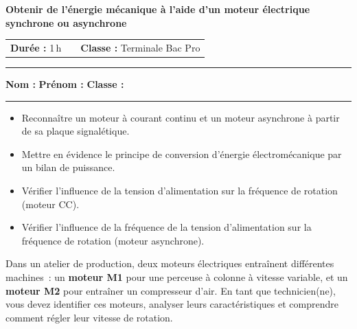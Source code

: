 \documentclass[12pt,a4paper]{article}
\begin{document}



\begin{center}
  {\Large\bfseries\color{mainblue}
    {Obtenir de l'\'{e}nergie m\'{e}canique \`{a} l'aide d'un moteur \'{e}lectrique} synchrone ou asynchrone}\\[0.4cm]
  \begin{tabular}{@{}lcr@{}}
    \textbf{Dur\'{e}e :} 1\,h
    & \hspace{4cm}
    & \textbf{Classe :} Terminale Bac Pro
  \end{tabular}
\end{center}

{\color{mainblue}\rule{\linewidth}{1pt}}

\vspace{0.3cm}
\textbf{Nom :} \dotfill \hspace{2cm} \textbf{Pr\'{e}nom :} \dotfill \hspace{2cm} \textbf{Classe :} \dotfill

\vspace{0.3cm}
{\color{mainblue}\rule{\linewidth}{1pt}}
\vspace{0.4cm}

\begin{competences}
\begin{itemize}[noitemsep, leftmargin=*]
  \item Reconna\^{i}tre un moteur \`{a} courant continu et un moteur asynchrone \`{a} partir de sa plaque signal\'{e}tique.
  \item Mettre en \'{e}vidence le principe de conversion d'\'{e}nergie \'{e}lectrom\'{e}canique par un bilan de puissance.
  \item V\'{e}rifier l'influence de la tension d'alimentation sur la fr\'{e}quence de rotation (moteur CC).
  \item V\'{e}rifier l'influence de la fr\'{e}quence de la tension d'alimentation sur la fr\'{e}quence de rotation (moteur asynchrone).
\end{itemize}
\end{competences}

\vspace{0.4cm}

\begin{contexte}
Dans un atelier de production, deux moteurs \'{e}lectriques entra\^{i}nent diff\'{e}rentes machines~: un
\textbf{moteur M1} pour une perceuse \`{a} colonne \`{a} vitesse variable, et un \textbf{moteur M2} pour
entra\^{i}ner un compresseur d'air. En tant que technicien(ne), vous devez identifier ces moteurs,
analyser leurs caract\'{e}ristiques et comprendre comment r\'{e}gler leur vitesse de rotation.
\end{contexte}
\end{document}
